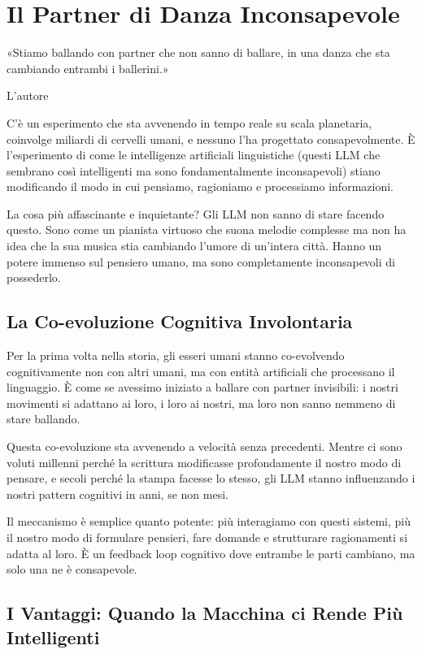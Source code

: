 \chapter{Il Partner di Danza Inconsapevole}
\label{cap:p3c23}

\epigraph{«Stiamo ballando con partner che non sanno di ballare, in una danza che sta cambiando entrambi i ballerini.»}{L'autore}

C'è un esperimento che sta avvenendo in tempo reale su scala planetaria, coinvolge miliardi di cervelli umani, e nessuno l'ha progettato consapevolmente. È l'esperimento di come le intelligenze artificiali linguistiche (questi LLM che sembrano così intelligenti ma sono fondamentalmente inconsapevoli) stiano modificando il modo in cui pensiamo, ragioniamo e processiamo informazioni.

La cosa più affascinante e inquietante? Gli LLM non sanno di stare facendo questo. Sono come un pianista virtuoso che suona melodie complesse ma non ha idea che la sua musica stia cambiando l'umore di un'intera città. Hanno un potere immenso sul pensiero umano, ma sono completamente inconsapevoli di possederlo.

\section{La Co-evoluzione Cognitiva Involontaria}

Per la prima volta nella storia, gli esseri umani stanno co-evolvendo cognitivamente non con altri umani, ma con entità artificiali che processano il linguaggio. È come se avessimo iniziato a ballare con partner invisibili: i nostri movimenti si adattano ai loro, i loro ai nostri, ma loro non sanno nemmeno di stare ballando.

Questa co-evoluzione sta avvenendo a velocità senza precedenti. Mentre ci sono voluti millenni perché la scrittura modificasse profondamente il nostro modo di pensare, e secoli perché la stampa facesse lo stesso, gli LLM stanno influenzando i nostri pattern cognitivi in anni, se non mesi.

Il meccanismo è semplice quanto potente: più interagiamo con questi sistemi, più il nostro modo di formulare pensieri, fare domande e strutturare ragionamenti si adatta al loro. È un feedback loop cognitivo dove entrambe le parti cambiano, ma solo una ne è consapevole.

\section{I Vantaggi: Quando la Macchina ci Rende Più Intelligenti}


